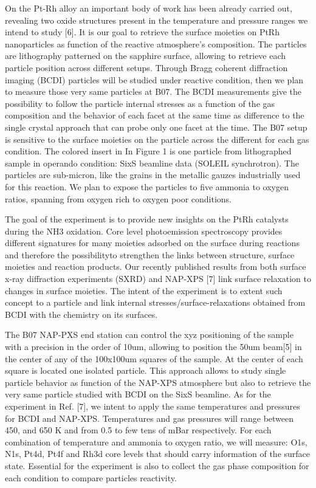 On the Pt-Rh alloy an important body of work has been
already carried out, revealing two oxide structures present in the temperature and
pressure ranges we intend to study [6].
It is our goal to retrieve the surface moieties on PtRh nanoparticles as function of the reactive atmosphere’s composition.
The particles are lithography patterned on the sapphire surface, allowing to retrieve each particle position across different setups.
Through Bragg coherent diffraction imaging (BCDI) particles will be studied under reactive condition, then we plan to measure those very same particles at B07. The BCDI measurements give the possibility to follow the particle internal stresses as a function of the gas composition and the behavior of each facet at the same time as difference to the single crystal approach that can probe only one facet at the time.
The B07 setup is sensitive to the surface moieties on the particle across the different for each gas condition.
The colored insert in In Figure 1 is one particle from lithographed sample in operando condition: SixS beamline data (SOLEIL synchrotron).
The particles are sub-micron, like the grains in the metallic gauzes industrially used for this reaction. We plan to expose the particles to five ammonia to oxygen ratios, spanning from oxygen rich to oxygen poor conditions.

The goal of the experiment is to provide new insights on the PtRh catalysts during the NH3 oxidation.
Core level photoemission spectroscopy provides different signatures for many moieties adsorbed on the surface during reactions and therefore the possibilityto strengthen the links between structure, surface moieties and reaction products.
Our recently published results from both surface x-ray diffraction experiments (SXRD) and NAP-XPS [7] link surface relaxation to changes in surface moieties.
The intent of the experiment is to extent such concept to a particle and link internal stresses/surface-relaxations obtained from BCDI with the chemistry on its surfaces.

The B07 NAP-PXS end station can control the xyz positioning of the sample with a precision in the order of 10um, allowing to position the 50um beam[5] in the center of
any of the 100x100um squares of the sample.
At the center of each square is located one isolated particle.
This approach allows to study single particle behavior as function of the NAP-XPS atmosphere but also to retrieve the very same particle studied with BCDI on the SixS beamline.
As for the experiment in Ref. [7], we intent to apply the same temperatures and pressures for BCDI and NAP-XPS.
Temperatures and gas pressures will range between 450, and 650 K and from 0.5 to few tens of mBar respectively.
For each combination of temperature and ammonia to oxygen ratio, we will measure: O1s, N1s, Pt4d, Pt4f and Rh3d core levels that should carry information of the surface state.
Essential for the experiment is also to collect the gas phase composition for each condition to compare particles reactivity.

